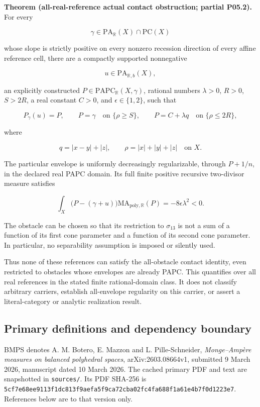 \documentclass[
  10pt,
]{article}
\begin{document}
\textbf{Theorem (all-real-reference actual contact obstruction; partial
P05.2).} For every

\[
\gamma\in\mathrm{PA}_{\mathbb R}(X)\cap\mathrm{PC}(X)
\]

whose slope is strictly positive on every nonzero recession direction of
every affine reference cell, there are a compactly supported nonnegative

\[
u\in\mathrm{PA}_{\mathbb R,b}(X),
\]

an explicitly constructed \(P\in\mathrm{PAPC}_{\mathbb R}(X,\gamma)\),
rational numbers \(\lambda>0\), \(R>0\), \(S>2R\), a real constant
\(C>0\), and \(\epsilon\in\{1,2\}\), such that

\[
P_\gamma(u)=P,\qquad P=\gamma\quad\text{on }\{\rho\geq S\},
\qquad P=C+\lambda q\quad\text{on }\{\rho\leq2R\},
\]

where

\[
q=|x-y|+|z|,\qquad \rho=|x|+|y|+|z|\quad\text{on }X.
\]

The particular envelope is uniformly decreasingly regularizable, through
\(P+1/n\), in the declared real PAPC domain. Its full finite positive
recursive two-divisor measure satisfies

\[
\int_X\bigl(P-(\gamma+u)\bigr)
\mathrm{MA}_{\mathrm{poly},\mathbb R}(P)
=-8\epsilon\lambda^2<0. \tag{T}
\]

The obstacle can be chosen so that its restriction to \(\sigma_{13}\) is
not a sum of a function of its first cone parameter and a function of
its second cone parameter. In particular, no separability assumption is
imposed or silently used.

Thus none of these references can satisfy the all-obstacle contact
identity, even restricted to obstacles whose envelopes are already PAPC.
This quantifies over all real references in the stated finite
rational-domain class. It does not classify arbitrary carriers,
establish all-envelope regularity on this carrier, or assert a
literal-category or analytic realization result.

\subsection{Primary definitions and dependency
boundary}\label{primary-definitions-and-dependency-boundary}

BMPS denotes A. M. Botero, E. Mazzon and L. Pille-Schneider,
\emph{Monge--Ampère measures on balanced polyhedral spaces},
arXiv:2603.08664v1, submitted 9 March 2026, manuscript dated 10 March
2026. The cached primary PDF and text are snapshotted in
\texttt{sources/}. Its PDF SHA-256 is
\texttt{5cf7e68ee9113f1dc813f9aefa5f9ca72cba02fc4fa688f1a61e4b7f0d1223e7}.
References below are to that version only.
\end{document}
